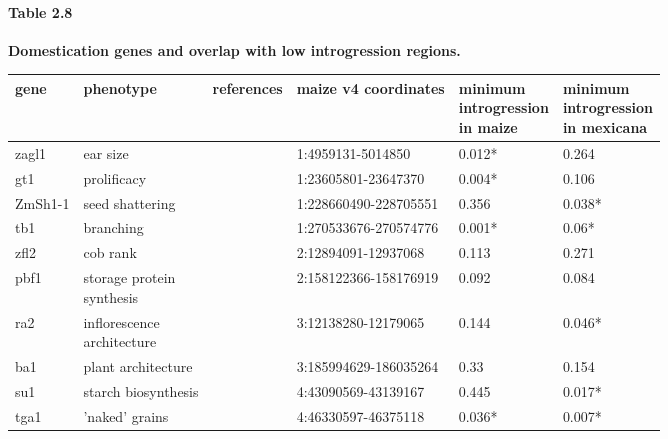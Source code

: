 \begin{sidewaystable}[ht]

\paragraph*{Table 2.8}
\label{genes_outliers}
{\bf Domestication genes and overlap with low introgression regions.}
\newline
\\
\centering
\begin{tabular}{llllll}
  \hline
gene & phenotype & references & maize v4 coordinates & \makecell[bl]{minimum\\ introgression
\\ in maize} & \makecell[bl]{minimum\\ introgression\\
 in mexicana} \\ 
  \hline
zagl1 & ear size & \cite{Wills:2018_zagl1} & 1:4959131-5014850 & 0.012* & 0.264 \\ 
  gt1 & prolificacy & \cite{Wills:2013_gt1} & 1:23605801-23647370 & 0.004* & 0.106 \\ 
  ZmSh1-1 & seed shattering & \cite{Lin:2012_shattering} & 1:228660490-228705551 & 0.356 & 0.038* \\ 
  tb1 & branching & \cite{Doebley_Stec_Gustus:1995_tb1, Doebley_Stec_Hubbard:1997_tb1, Dong:2019_reg_domestication} & 1:270533676-270574776 & 0.001* & 0.06* \\ 
  zfl2 & cob rank  & \cite{Doebley_Stec:1991, Doebley_Stec:1993, Bomblies_Doebley:2006} & 2:12894091-12937068 & 0.113 & 0.271 \\ 
  pbf1 & \makecell[tl]{storage protein\\ synthesis} & \cite{Wang:1998_pbf} & 2:158122366-158176919 & 0.092 & 0.084 \\ 
  ra2 & \makecell[tl]{inflorescence\\ architecture} & \cite{Vollbrecht:2005_ramosa} & 3:12138280-12179065 & 0.144 & 0.046* \\ 
  ba1 & plant architecture & \cite{Gallavotti:2004_ba1} & 3:185994629-186035264 & 0.33 & 0.154 \\ 
  su1 & starch biosynthesis & \cite{Whitt:2002_starch} & 4:43090569-43139167 & 0.445 & 0.017* \\ 
  tga1 & 'naked' grains & \cite{Dorweiler:1993, Wang:2005_tga1} & 4:46330597-46375118 & 0.036* & 0.007* \\ 

\end{tabular}
\end{sidewaystable}
